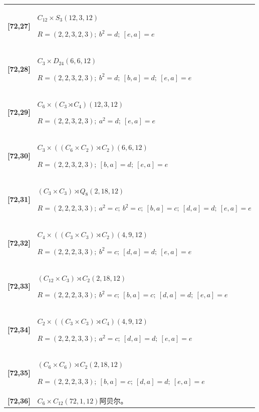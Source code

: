 \documentclass[UTF8,fontset=fandol,11pt,a4paper]{ctexart}
\begin{document}
\begin{longtable}{@{}p{17mm}>{\raggedright\arraybackslash}p{141mm}@{}}
\textbf{[72,27]} & $C_{12}\times S_{3}$\quad $(12,3,12)$\par\(R=(2,2,3,2,3);\allowbreak\ b^{2}=d;\allowbreak\ [e,a]=e\)\\[3pt]

\textbf{[72,28]} & $C_{3}\times D_{24}$\quad $(6,6,12)$\par\(R=(2,2,3,2,3);\allowbreak\ b^{2}=d;\allowbreak\ [b,a]=d;\allowbreak\ [e,a]=e\)\\[3pt]

\textbf{[72,29]} & $C_{6}\times (C_{3}\rtimes C_{4})$\quad $(12,3,12)$\par\(R=(2,2,3,2,3);\allowbreak\ a^{2}=d;\allowbreak\ [e,a]=e\)\\[3pt]

\textbf{[72,30]} & $C_{3}\times ((C_{6}\times C_{2})\rtimes C_{2})$\quad $(6,6,12)$\par\(R=(2,2,3,2,3);\allowbreak\ [b,a]=d;\allowbreak\ [e,a]=e\)\\[3pt]

\textbf{[72,31]} & $(C_{3}\times C_{3})\rtimes Q_{8}$\quad $(2,18,12)$\par\(R=(2,2,2,3,3);\allowbreak\ a^{2}=c;\allowbreak\ b^{2}=c;\allowbreak\ [b,a]=c;\allowbreak\ [d,a]=d;\allowbreak\ [e,a]=e\)\\[3pt]

\textbf{[72,32]} & $C_{4}\times ((C_{3}\times C_{3})\rtimes C_{2})$\quad $(4,9,12)$\par\(R=(2,2,2,3,3);\allowbreak\ b^{2}=c;\allowbreak\ [d,a]=d;\allowbreak\ [e,a]=e\)\\[3pt]

\textbf{[72,33]} & $(C_{12}\times C_{3})\rtimes C_{2}$\quad $(2,18,12)$\par\(R=(2,2,2,3,3);\allowbreak\ b^{2}=c;\allowbreak\ [b,a]=c;\allowbreak\ [d,a]=d;\allowbreak\ [e,a]=e\)\\[3pt]

\textbf{[72,34]} & $C_{2}\times ((C_{3}\times C_{3})\rtimes C_{4})$\quad $(4,9,12)$\par\(R=(2,2,2,3,3);\allowbreak\ a^{2}=c;\allowbreak\ [d,a]=d;\allowbreak\ [e,a]=e\)\\[3pt]

\textbf{[72,35]} & $(C_{6}\times C_{6})\rtimes C_{2}$\quad $(2,18,12)$\par\(R=(2,2,2,3,3);\allowbreak\ [b,a]=c;\allowbreak\ [d,a]=d;\allowbreak\ [e,a]=e\)\\[3pt]

\textbf{[72,36]} & $C_{6}\times C_{12}$\quad $(72,1,12)$\quad 阿贝尔。\\[3pt]


\end{longtable}
\end{document}

